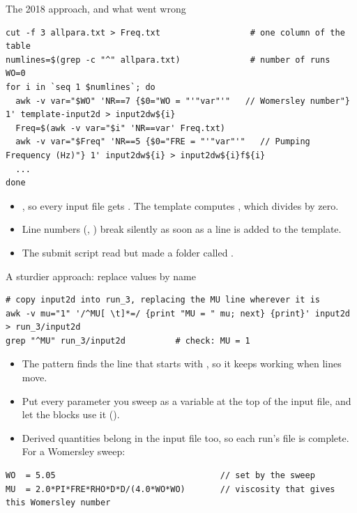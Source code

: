 \documentclass[aspectratio=169,11pt]{beamer}
\begin{document}
\begin{frame}[fragile]{The 2018 approach, and what went wrong}
\begin{lstlisting}[style=shell,basicstyle=\ttfamily\tiny\color{BlackGray}]
cut -f 3 allpara.txt > Freq.txt                  # one column of the table
numlines=$(grep -c "^" allpara.txt)              # number of runs
WO=0
for i in `seq 1 $numlines`; do
  awk -v var="$WO" 'NR==7 {$0="WO = "'"var"'"   // Womersley number"} 1' template-input2d > input2dw${i}
  Freq=$(awk -v var="$i" 'NR==var' Freq.txt)
  awk -v var="$Freq" 'NR==5 {$0="FRE = "'"var"'"   // Pumping Frequency (Hz)"} 1' input2dw${i} > input2dw${i}f${i}
  ...
done
\end{lstlisting}
\begin{itemize}\small
  \item {}, so every input file gets . The template computes , which divides by zero.
  \item Line numbers (, ) break silently as soon as a line is added to the template.
  \item The submit script read  but made a folder called .
\end{itemize}
\end{frame}

\begin{frame}[fragile]{A sturdier approach: replace values by name}
\begin{lstlisting}[style=shell]
# copy input2d into run_3, replacing the MU line wherever it is
awk -v mu="1" '/^MU[ \t]*=/ {print "MU = " mu; next} {print}' input2d > run_3/input2d
grep "^MU" run_3/input2d          # check: MU = 1
\end{lstlisting}
\begin{itemize}\small
  \item The pattern  finds the line that starts with , so it keeps working when lines move.
  \item Put every parameter you sweep as a variable at the top of the input file, and let the blocks use it ().
  \item Derived quantities belong in the input file too, so each run's file is complete. For a Womersley sweep:
\end{itemize}
\vspace{-1mm}
\begin{lstlisting}
WO  = 5.05                                 // set by the sweep
MU  = 2.0*PI*FRE*RHO*D*D/(4.0*WO*WO)       // viscosity that gives this Womersley number
\end{lstlisting}
\end{frame}
\end{document}
